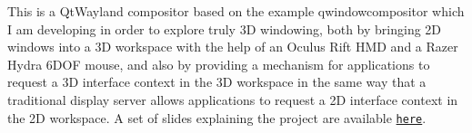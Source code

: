 This is a Qt\-Wayland compositor based on the example qwindowcompositor which I am developing in order to explore truly 3\-D windowing, both by bringing 2\-D windows into a 3\-D workspace with the help of an Oculus Rift H\-M\-D and a Razer Hydra 6\-D\-O\-F mouse, and also by providing a mechanism for applications to request a 3\-D interface context in the 3\-D workspace in the same way that a traditional display server allows applications to request a 2\-D interface context in the 2\-D workspace. A set of slides explaining the project are available \href{https://docs.google.com/presentation/d/1okL5quA3wzd9oFmWkhbUjWEU89-YJKB3lOPBnHoaE28/edit?usp=sharing}{\tt here}. 